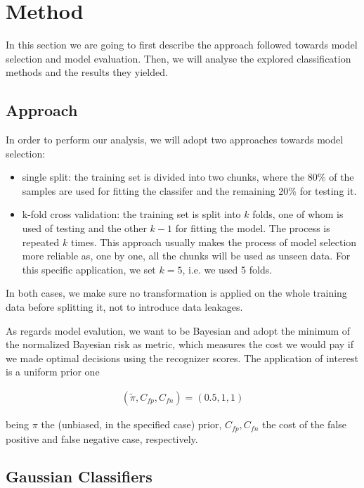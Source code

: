 \section{Method}
In this section we are going to first describe the approach followed towards model selection and model evaluation. Then, we will analyse the explored classification methods and the results they yielded.
 
\subsection{Approach}
In order to perform our analysis, we will adopt two approaches towards model selection:
\begin{itemize}
	\item single split: the training set is divided into two chunks, where the 80\% of the samples are used for fitting the classifer and the remaining 20\% for testing it. 
	\item k-fold cross validation: the training set is split into $k$ folds, one of whom is used of testing and the other $k - 1$ for fitting the model. The process is repeated $k$ times. This approach usually makes the process of model selection more reliable as, one by one, all the chunks will be used as unseen data. 
	For this specific application, we set $k = 5$, i.e. we used 5 folds.
\end{itemize}
In both cases, we make sure no transformation is applied on the whole training data before splitting it, not to introduce data leakages.  

As regards model evalution, we want to be Bayesian and adopt the minimum of the normalized Bayesian risk as metric, which measures the cost we would pay if we made optimal decisions using the recognizer scores. The application of interest is a uniform prior one

\begin{align*}
	(\tilde{\pi}, C_{fp}, C_{fn}) = (0.5, 1, 1)
\end{align*}

being $\pi$ the (unbiased, in the specified case) prior, $C_{fp}, C_{fn}$ the cost of the false positive and false negative case, respectively.

\subsection{Gaussian Classifiers}

